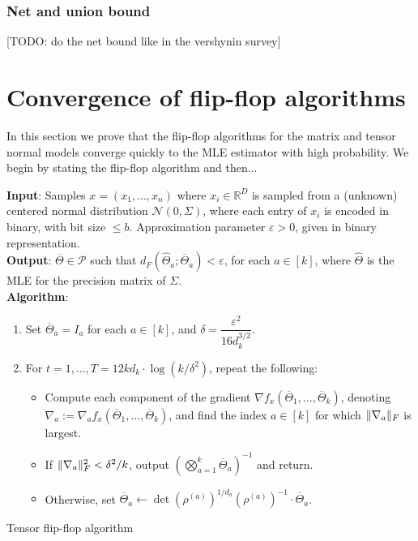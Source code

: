 \documentclass[aos]{imsart}
\theoremstyle{definition}
\DeclarePairedDelimiter{\norm}{\lVert}{\rVert}
\newcommand{\R}{{\mathbb{R}}}
\newcommand{\otheta}{\overline{\Theta}}
\newcommand{\htheta}{\widehat{\Theta}}
\newcommand{\eps}{\varepsilon}
\newcommand{\cN}{\mathcal{N}}
\newcommand{\SPD}{\mathcal{P}}
\newcommand{\samp}{x}
\newcommand{\TODO}[1]{{\color{blue}[TODO: #1]}}
\begin{document}
\subsubsection{Net and union bound}
\TODO{do the net bound like in the vershynin survey}




\section{Convergence of flip-flop algorithms}
In this section we prove that the flip-flop algorithms for the matrix and tensor normal models converge quickly to the MLE estimator with high probability. We begin by stating the flip-flop algorithm and then...

\begin{Algorithm}
\textbf{Input}: Samples $\samp = (\samp_1, \ldots, \samp_n)$ where $\samp_i \in \R^D$ is sampled from a (unknown) centered normal distribution $\cN(0, \Sigma)$, where each entry of $\samp_i$ is encoded in binary, with bit size $\le b$. Approximation parameter $\eps > 0$, given in binary representation. \\[.3ex]

\textbf{Output}: $\otheta \in \SPD$ such that $d_F(\htheta_a; \otheta_a) < \eps$, for each $a \in [k]$, where $\htheta$ is the MLE for the precision matrix of $\Sigma$. \\[.3ex]

\textbf{Algorithm}:
\begin{enumerate}
\item\label{it:flip-flop step 1} Set $\otheta_a = I_a$ for each $a \in [k]$, and $\delta = \dfrac{\eps^2}{16 d_k^{3/2}}$.
\item\label{it:flip-flop step 2} For $t=1,\dots,T = 12 k d_k \cdot \log(k/\delta^2)$, repeat the following:
\begin{itemize}
\item Compute each component of the gradient $\nabla f_{\samp}(\otheta_1, \ldots, \otheta_k)$, denoting $\nabla_a := \nabla_a f_{\samp}(\otheta_1, \ldots, \otheta_k)$, and find the index $a \in [k]$ for which $\norm{\nabla_a}_F$ is largest.
\item
If $\norm{\nabla_a}_F^2 < \delta^2/k$, output $\left( \bigotimes_{a =1}^k \otheta_a \right)^{-1}$ and return.
\item Otherwise, set $\otheta_a \leftarrow \det(\rho^{(a)})^{1/d_a} (\rho^{(a)})^{-1} \cdot \otheta_a$.
\end{itemize}
\end{enumerate}
\caption{Tensor flip-flop algorithm}\label{alg:flip-flop}
\end{Algorithm}
\end{document}
